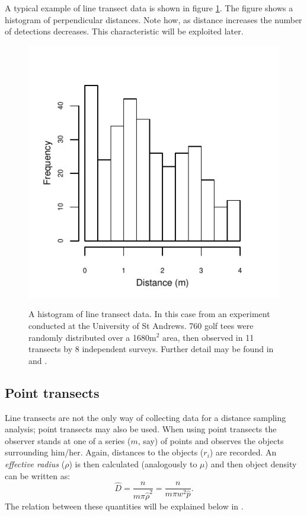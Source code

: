 A typical example of line transect data is shown in figure \ref{ds-lt-example}. The figure shows a histogram of perpendicular distances. Note how, as distance increases the number of detections decreases. This characteristic will be exploited later.

\begin{figure}
\centering
\includegraphics{intro/figs/ds-golftee.pdf}\\
\caption{A histogram of line transect data. In this case from an experiment conducted at the University of St Andrews. 760 golf tees were randomly distributed over a 1680m$^2$ area, then observed in 11 transects by 8 independent surveys. Further detail may be found in  and .}
\label{ds-lt-example}
\end{figure}

\subsection{Point transects}
Line transects are not the only way of collecting data for a distance sampling analysis; point transects may also be used. When using point transects the observer stands at one of a series ($m$, say) of points and observes the objects surrounding him/her. Again, distances to the objects ($r_i$) are recorded. An \textit{effective radius} ($\rho$) is then calculated (analogously to $\mu$) and then object density can be written as:
\begin{equation*}
\hat{D}=\frac{n}{m \pi \hat{\rho}^2}=\frac{n}{m\pi w^2\hat{p}}.
\end{equation*}
The relation between these quantities will be explained below in .

